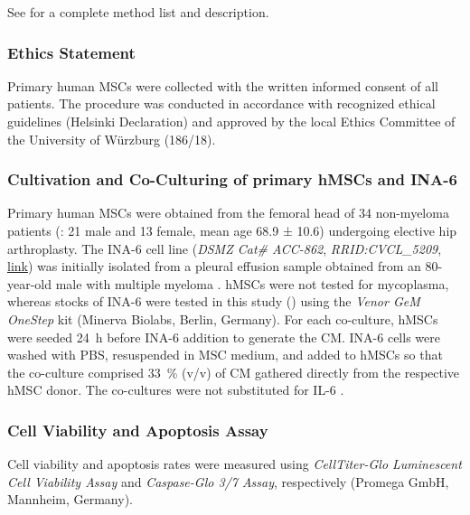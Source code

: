 %
\label{C1:methods}%
See  for a complete method list and description.


\subsubsection*{Ethics Statement}%
\label{C1:methods_ethics}%
Primary human MSCs were collected with the written informed consent of all
patients. The procedure was conducted in accordance with recognized ethical
guidelines (Helsinki Declaration) and approved by the local Ethics Committee of
the University of Würzburg (186/18).



\subsubsection*{Cultivation and Co-Culturing of primary hMSCs and INA-6}%
\label{C1:methods_cultivation}%
Primary human MSCs were obtained from the femoral head of 34 non-myeloma
patients (: 21 male and 13 female, mean age
68.9 ± 10.6) undergoing elective hip arthroplasty. The INA-6 cell line
(\textit{DSMZ Cat\# ACC-862}, \textit{RRID:CVCL\_5209},
\href{https://www.cellosaurus.org/CVCL_5209}{link}) was initially isolated from
a pleural effusion sample obtained from an 80-year-old male with multiple
myeloma \cite{burgerGp130RasMediated2001,gramatzkiTwoNewInterleukin61994}.
hMSCs were not tested for mycoplasma, whereas stocks of INA-6 were tested in
this study () using the \textit{Venor GeM
    OneStep} kit (Minerva Biolabs, Berlin, Germany). For each co-culture, hMSCs were
seeded \SI{24}{\hour} before INA-6 addition to generate the \ac{CM}. INA-6 cells
were washed with PBS, resuspended in MSC medium, and added to hMSCs so that the
co-culture comprised \SI{33}{\percent} (v/v) of CM gathered directly from the
respective hMSC donor. The co-cultures were not substituted for IL-6
\cite{chatterjeePresenceBoneMarrow2002}.




\subsubsection*{Cell Viability and Apoptosis Assay}%
\label{C1:methods_cellviability}%
Cell viability and apoptosis rates were measured using \textit{CellTiter-Glo Luminescent
    Cell Viability Assay} and \textit{Caspase-Glo 3/7 Assay}, respectively (Promega GmbH,
Mannheim, Germany).


